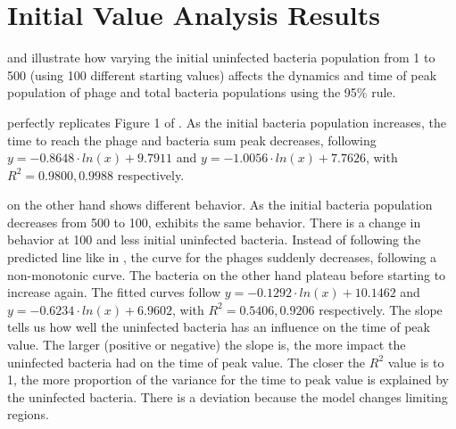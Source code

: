 \section{Initial Value Analysis Results}
\label{sec:results:initial_value_analysis}

 and  illustrate how varying the initial uninfected bacteria population from 1 to 500 (using 100 different starting values) affects the dynamics and time of peak population of phage and total bacteria populations using the 95\% rule. 

 perfectly replicates Figure 1 of \citet{mullaExtremeDiversityPhage2024}. 
As the initial bacteria population increases, the time to reach the phage and bacteria sum peak decreases, following $y = -0.8648\cdot ln(x) + 9.7911$ and $y = -1.0056\cdot ln(x)+7.7626$, with $R^2=0.9800, 0.9988$ respectively. 

 on the other hand shows different behavior. 
As the initial bacteria population decreases from 500 to 100,  exhibits the same behavior. 
There is a change in behavior at 100 and less initial uninfected bacteria. 
Instead of following the predicted line like in , the curve for the phages suddenly decreases, following a non-monotonic curve. 
The bacteria on the other hand plateau before starting to increase again. 
The fitted curves follow $y = -0.1292\cdot ln(x) + 10.1462$ and $y = -0.6234\cdot ln(x)+6.9602$, with $R^2=0.5406, 0.9206$ respectively. 
The slope tells us how well the uninfected bacteria has an influence on the time of peak value. 
The larger (positive or negative) the slope is, the more impact the uninfected bacteria had on the time of peak value. 
The closer the $R^2$ value is to 1, the more proportion of the variance for the time to peak value is explained by the uninfected bacteria. 
There is a deviation because the model changes limiting regions. 

